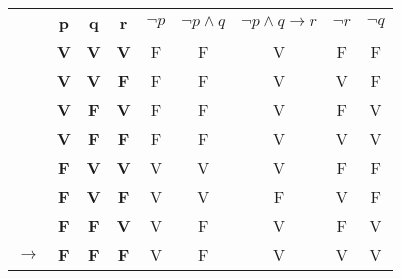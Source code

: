 \begin{table}[h]
\centering
\begin{tabular}{lc|c|c|c|c|c|c||c}
\cline{2-9}
                  & \textbf{p} & \textbf{q} & \textbf{r} & {\color[HTML]{FE0000} \textbf{$\neg p$}} & \textbf{$\neg p \wedge q$} & {\color[HTML]{FE0000} \textbf{$\neg p \wedge q \rightarrow r$}} & {\color[HTML]{FE0000} \textbf{$\neg r$}} & {\color[HTML]{3531FF} \textbf{$\neg q$}} \\ \cline{2-9} 
                  & \textbf{V} & \textbf{V} & \textbf{V} & F                                        & F                          & {\color[HTML]{32CB00} V}                                        & F                                        & F                                        \\ \cline{2-9} 
                  & \textbf{V} & \textbf{V} & \textbf{F} & F                                        & F                          & {\color[HTML]{32CB00} V}                                        & {\color[HTML]{32CB00} V}                 & F                                        \\ \cline{2-9} 
                  & \textbf{V} & \textbf{F} & \textbf{V} & F                                        & F                          & {\color[HTML]{32CB00} V}                                        & F                                        & V                                        \\ \cline{2-9} 
                  & \textbf{V} & \textbf{F} & \textbf{F} & F                                        & F                          & {\color[HTML]{32CB00} V}                                        & {\color[HTML]{32CB00} V}                 & V                                        \\ \cline{2-9} 
                  & \textbf{F} & \textbf{V} & \textbf{V} & {\color[HTML]{32CB00} V}                 & V                          & {\color[HTML]{32CB00} V}                                        & F                                        & F                                        \\ \cline{2-9} 
                  & \textbf{F} & \textbf{V} & \textbf{F} & {\color[HTML]{32CB00} V}                 & V                          & F                                                               & {\color[HTML]{32CB00} V}                 & F                                        \\ \cline{2-9} 
                  & \textbf{F} & \textbf{F} & \textbf{V} & {\color[HTML]{32CB00} V}                 & F                          & {\color[HTML]{32CB00} V}                                        & F                                        & V                                        \\ \cline{2-9} 
$\longrightarrow$ & \textbf{F} & \textbf{F} & \textbf{F} & {\color[HTML]{32CB00} V}                 & F                          & {\color[HTML]{32CB00} V}                                        & {\color[HTML]{32CB00} V}                 & V                                        \\ \cline{2-9} 
\end{tabular}
\end{table}

